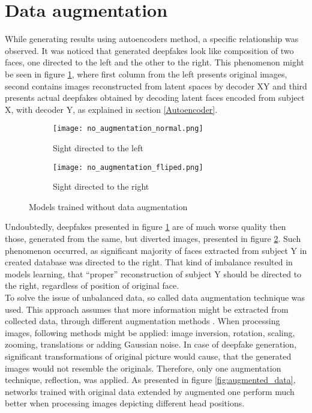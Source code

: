 \newpage
\section{Data augmentation}
While generating results using autoencoders method, a specific relationship was observed. It was noticed that generated deepfakes look like composition of two faces, one directed to the left and the other to the right. This phenomenon might be seen in figure \ref{subfig:no_augmentation_normal}, where first column from the left presents original images, second contains images reconstructed from latent spaces by decoder XY and third presents actual deepfakes obtained by decoding latent faces encoded from subject X, with decoder Y, as explained in section \ref{Autoencoder}.

\begin{figure}[H]
\centering
\begin{subfigure}{.5\textwidth}
  \centering
  \texttt{[image: no\_augmentation\_normal.png]}
  \caption{Sight directed to the left}
  \label{subfig:no_augmentation_normal}
\end{subfigure}%
\begin{subfigure}{.5\textwidth}
  \centering
  \texttt{[image: no\_augmentation\_fliped.png]}
  \caption{Sight directed to the right}
  \label{subfig:no_augmentation_fliped}
\end{subfigure}
\caption{Models trained without data augmentation}
\label{fig:no_augmented_data}
\end{figure}

Undoubtedly, deepfakes presented in figure \ref{subfig:no_augmentation_normal} are of much worse quality then those, generated from the same, but diverted images, presented in figure \ref{subfig:no_augmentation_fliped}. Such phenomenon occurred, as significant majority of faces extracted from subject Y in created database was directed to the right. That kind of imbalance resulted in models learning, that ``proper'' reconstruction of subject Y should be directed to the right, regardless of position of original face.\\

To solve the issue of unbalanced data, so called data augmentation technique was used. This approach assumes that more information might be extracted from collected data, through different augmentation methods \cite{data_augmentation_bib}. When processing images, following methods might be applied: image inversion, rotation, scaling, zooming, translations or adding Gaussian noise. In case of deepfake generation, significant transformations of original picture would cause, that the generated images would not resemble the originals. Therefore, only one augmentation technique, reflection, was applied. As presented in figure \ref{fig:augmented_data}, networks trained with original data extended by augmented one perform much better when processing images depicting different head positions. 

